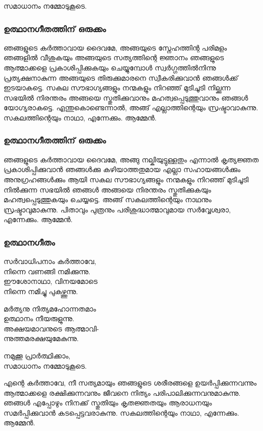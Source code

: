 \documentclass[20pt]{beamer}
\newcommand{\Priest}[1]{\color{white}#1}
\newcommand{\People}[1]{\color{yellow}#1}
\newcommand{\Server}[1]{\color{lightgray}#1}
\newcommand{\SignOfCross}{പിതാവും പുത്രനും പരിശുദ്ധാത്മാവുമായ സര്‍വ്വേശ്വരാ, എന്നേക്കും.}
\newcommand{\Ammen}{\People{ആമ്മേന്‍.}}
\newcommand{\Peace}{\Server{സമാധാനം നമ്മോടുകൂടെ.}}
\newcommand{\LetsPray}{\Server{നമുക്കൂ പ്രാര്‍ത്ഥിക്കാം,\\ സമാധാനം നമ്മോടുകൂടെ.}}
\begin{document}
\begin{frame}
\Peace
\end{frame}

\begin{frame}[allowframebreaks]
\frametitle{ഉത്ഥാനഗീതത്തിന് ഒരുക്കം}
\Priest{
ഞങ്ങളുടെ കര്‍ത്താവായ ദൈവമേ, അങ്ങയുടെ സ്നേഹത്തിന്റ
പരിമളം ഞങ്ങളില്‍ വീശുകയും അങ്ങയുടെ സത്യത്തിന്റെ
ജ്ഞാനം ഞങ്ങളുടെ ആത്മാക്കളെ പ്രകാശിപ്പിക്കുകയും
ചെയ്യുമ്പോള്‍ സ്വര്‍ഗ്ഗത്തില്‍നിന്നു പ്രത്യക്ഷനാകുന്ന
അങ്ങയുടെ തിരുക്കുമാരനെ സ്വീകരിക്കുവാന്‍ ഞങ്ങള്‍ക്ക്
ഇടയാകട്ടെ. സകല സൗഭാഗ്യങ്ങളും നന്മകളും നിറഞ്ഞ്
മുടിചൂടി നില്ക്കുന്ന സഭയില്‍ നിരന്തരം അങ്ങയെ സ്തുതിക്കുവാനും
മഹത്വപ്പെടുത്തുവാനും ഞങ്ങള്‍ യോഗ്യരാകട്ടെ.
എന്തുകൊണ്ടെന്നാല്‍, അങ്ങ് എല്ലാത്തിന്റെയും സ്രഷ്ടാവാകുന്നു.
സകലത്തിന്റെയും നാഥാ, എന്നേക്കും.} \Ammen
\end{frame}

\begin{frame}[allowframebreaks]
\frametitle{ഉത്ഥാനഗീതത്തിന് ഒരുക്കം}
\Priest{
ഞങ്ങളുടെ കര്‍ത്താവായ ദൈവമേ, അങ്ങു നല്കിയുട്ടുള്ളതും
എന്നാല്‍ കൃത്യജ്ഞത പ്രകാശിപ്പിക്കുവാന്‍ ഞങ്ങള്‍ക്കു
കഴിയാത്തതുമായ എല്ലാ സഹായങ്ങള്‍ക്കും 
അനുഗ്രഹങ്ങള്‍ക്കും ആയി സകല സൗഭാഗ്യങ്ങളും
നന്മകളും നിറഞ്ഞ് മുടിചൂടി നില്‍ക്കുന്ന സഭയില്‍ ഞങ്ങള്‍
അങ്ങയെ നിരന്തരം സ്തുതിക്കുകയും മഹത്വപ്പെടുത്തുകയും ചെയ്യട്ടെ.
അങ്ങ് സകലത്തിന്റെയും നാഥനും സ്രഷ്ടാവുമാകുന്നു.
\SignOfCross} \Ammen
\end{frame}


\begin{frame}[allowframebreaks]
\frametitle{ഉത്ഥാനഗീതം}
\People{
സര്‍വാധിപനാം കര്‍ത്താവേ,\\
നിന്നെ വണങ്ങി നമിക്കുന്നു.\\
ഈശോനാഥാ, വിനയമോടെ\\
നിന്നെ നമിച്ചു പുകഴ്ത്തുന്നു.\par
മർത്യനു നിത്യമഹോന്നതമാം\\
ഉത്ഥാനം നീയരുളുന്നു.\\
അക്ഷയമാവനുടെ ആത്മാവി-\\
ന്നുത്തമരക്ഷയുമേകുന്നു.}
\end{frame}

\begin{frame}
\LetsPray
\end{frame}

\begin{frame}
\Priest{
എന്റെ കര്‍ത്താവേ, നീ സത്യമായും ഞങ്ങളുടെ ശരീരങ്ങളെ
ഉയര്‍പ്പിക്കുന്നവന്നും ആത്മാക്കളെ രക്ഷിക്കുന്നവനും ജീവനെ
നിത്യം പരിപാലിക്കുന്നവനുമാകുന്നു. ഞങ്ങള്‍ എപ്പോഴും
നിനക്ക് സ്തുതിയും കൃതജ്ഞതയും ആരാധനയും സമര്‍പ്പിക്കുവാന്‍
കടപ്പെട്ടവരാകുന്നു. സകലത്തിന്റെയും നാഥാ, എന്നേക്കും.}
\Ammen
\end{frame}
\end{document}
